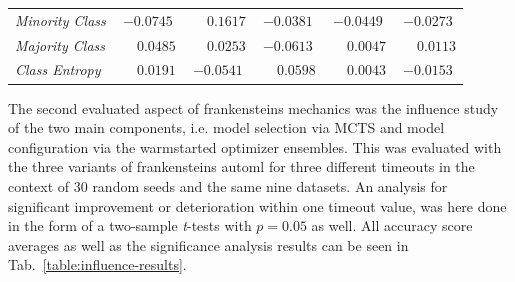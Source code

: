 \begin{table}[ht]
\begin{subtable}{\textwidth}
\begin{tabular}{l|ccccc}
            \textit{Minority Class} & $-0.0745$ & $\phantom{-}0.1617$ & $-0.0381$ & $-0.0449$ & $-0.0273$ \\
            \textit{Majority Class} & $\phantom{-}0.0485$ & $\phantom{-}0.0253$ & $-0.0613$ & $\phantom{-}0.0047$ & $\phantom{-}0.0113$ \\
            \textit{Class Entropy} & $\phantom{-}0.0191$ & $-0.0541$ & $\phantom{-}0.0598$ & $\phantom{-}0.0043$ & $-0.0153$ \\
            \hline
        \end{tabular}
    \end{subtable}
\end{table}

The second evaluated aspect of frankensteins mechanics was the influence study of the two main components, i.e. model selection via MCTS and model configuration via the warmstarted optimizer ensembles.\newline
This was evaluated with the three variants of frankensteins automl for three different timeouts in the context of 30 random seeds and the same nine datasets.
An analysis for significant improvement or deterioration within one timeout value, was here done in the form of a two-sample \textit{t}-tests with $p = 0.05$ as well.\newline
All accuracy score averages as well as the significance analysis results can be seen in Tab.~\ref{table:influence-results}.

